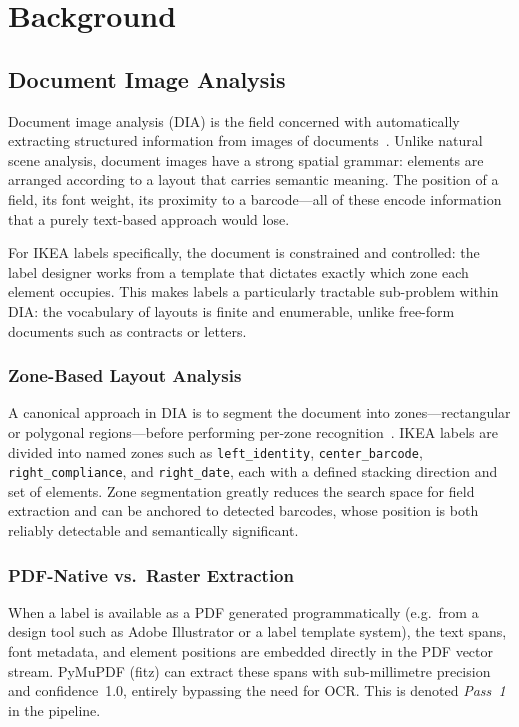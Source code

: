 \chapter{Background}
\label{ch:background}

\section{Document Image Analysis}

Document image analysis (\ac{DIA}) is the field concerned with automatically extracting
structured information from images of documents~\cite{nagy2000twenty}. Unlike natural
scene analysis, document images have a strong spatial grammar: elements are arranged
according to a layout that carries semantic meaning. The position of a field, its font weight,
its proximity to a barcode—all of these encode information that a purely text-based approach
would lose.

For IKEA labels specifically, the document is constrained and controlled: the label designer
works from a template that dictates exactly which zone each element occupies. This makes
labels a particularly tractable sub-problem within \ac{DIA}: the vocabulary of layouts is
finite and enumerable, unlike free-form documents such as contracts or letters.

\subsection{Zone-Based Layout Analysis}

A canonical approach in \ac{DIA} is to segment the document into zones—rectangular or
polygonal regions—before performing per-zone recognition~\cite{breuel2003pages}. IKEA
labels are divided into named zones such as \texttt{left\_identity}, \texttt{center\_barcode},
\texttt{right\_compliance}, and \texttt{right\_date}, each with a defined stacking direction
and set of elements. Zone segmentation greatly reduces the search space for field extraction
and can be anchored to detected barcodes, whose position is both reliably detectable and
semantically significant.

\subsection{PDF-Native vs.\ Raster Extraction}

When a label is available as a PDF generated programmatically (e.g.\ from a design tool
such as Adobe Illustrator or a label template system), the text spans, font metadata, and
element positions are embedded directly in the PDF vector stream. PyMuPDF (fitz) can
extract these spans with sub-millimetre precision and confidence~1.0, entirely bypassing the
need for \ac{OCR}. This is denoted \emph{Pass~1} in the pipeline.

